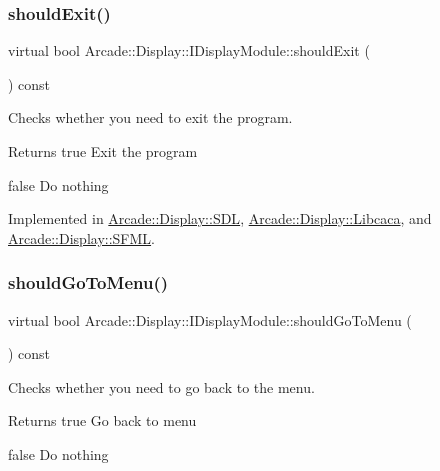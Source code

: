 \subsubsection{\texorpdfstring{shouldExit()}{shouldExit()}}
{\footnotesize\ttfamily virtual bool Arcade\+::\+Display\+::\+I\+Display\+Module\+::should\+Exit (\begin{DoxyParamCaption}{ }\end{DoxyParamCaption}) const\hspace{0.3cm}{\ttfamily [pure virtual]}}



Checks whether you need to exit the program. 

\begin{DoxyReturn}{Returns}
true Exit the program 

false Do nothing 
\end{DoxyReturn}


Implemented in \mbox{\hyperlink{classArcade_1_1Display_1_1SDL_adb5d8837174b0ca120a27a521320f9c0}{Arcade\+::\+Display\+::\+S\+DL}}, \mbox{\hyperlink{classArcade_1_1Display_1_1Libcaca_a5920c296d51d72df55b5079c0749031e}{Arcade\+::\+Display\+::\+Libcaca}}, and \mbox{\hyperlink{classArcade_1_1Display_1_1SFML_a780a71713551c8dffd1f008802f96767}{Arcade\+::\+Display\+::\+S\+F\+ML}}.

\mbox{\label{classArcade_1_1Display_1_1IDisplayModule_ad060f6b99f2adffaf02a4226fc40d0ab}} 
\subsubsection{\texorpdfstring{shouldGoToMenu()}{shouldGoToMenu()}}
{\footnotesize\ttfamily virtual bool Arcade\+::\+Display\+::\+I\+Display\+Module\+::should\+Go\+To\+Menu (\begin{DoxyParamCaption}{ }\end{DoxyParamCaption}) const\hspace{0.3cm}{\ttfamily [pure virtual]}}



Checks whether you need to go back to the menu. 

\begin{DoxyReturn}{Returns}
true Go back to menu 

false Do nothing 
\end{DoxyReturn}


